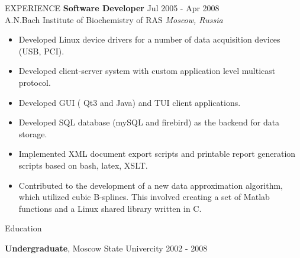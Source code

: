 \documentclass{resume} %
\begin{document}
\begin{rSection}{EXPERIENCE}
\textbf{Software Developer} \hfill Jul 2005 - Apr 2008\\
A.N.Bach Institute of Biochemistry of RAS \hfill \textit{Moscow, Russia}
 \begin{itemize}
    \itemsep -3pt {}
    \item Developed Linux device drivers for a number of data acquisition devices (USB, PCI).
    \item Developed client-server system with custom application level multicast protocol.
    \item Developed GUI ( Qt3 and Java) and TUI client applications.
    \item Developed SQL database (mySQL and firebird) as the backend for data storage.
    \item Implemented XML document export scripts and printable report generation scripts based on bash, latex, XSLT.
    \item Contributed to the development of a new data approximation algorithm, which utilized cubic B-splines. This involved creating a set of Matlab functions and a Linux shared library written in C.
 \end{itemize}

\end{rSection}


\begin{rSection}{Education}

{\bf Undergraduate}, Moscow State Univercity \hfill {2002 - 2008}

\end{rSection}
\end{document}
